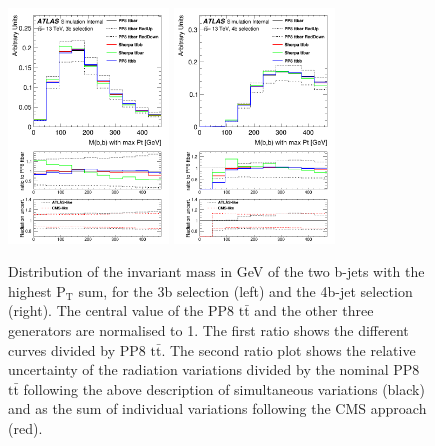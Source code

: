 \begin{figure}[!htb]
\centering
\includegraphics[width=0.38\textwidth]{Plots/ttbb/hisgenEvt_M_HardestGenBJets_4j3t__div}
\includegraphics[width=0.38\textwidth]{Plots/ttbb/hisgenEvt_M_HardestGenBJets_4j4t__div}
  \caption{Distribution of the invariant mass in GeV of the two b-jets with the highest $\mathrm{P_T}$ sum, for the 3b selection (left) and the 4b-jet selection (right). The central value of the PP8 $\mathrm{t\bar{t}}$ and the other three generators are normalised to 1. The first ratio shows the different curves divided by PP8 $\mathrm{t\bar{t}}$. The second ratio plot shows the relative uncertainty of the radiation variations divided by the nominal PP8 $\mathrm{t\bar{t}}$ following the above description of simultaneous variations (black) and as the sum of individual variations following the CMS approach (red). \label{ttbb:MbbmaxPT}}
\end{figure}

